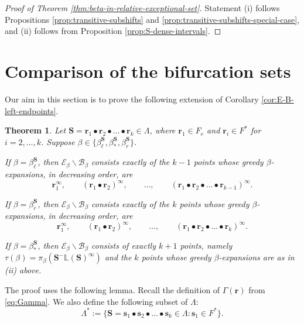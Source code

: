 \documentclass[11pt]{amsart}
\newtheorem{theorem}{Theorem}[section]
\theoremstyle{definition}
\theoremstyle{remark}
\numberwithin{equation}{section}
\renewcommand{\L}{\ensuremath{\mathbb{L}}}
\newcommand{\BB}{\mathscr{B}}
\newcommand{\EE}{\mathscr{E}}
\newcommand{\s}{ {\mathbf{s}}}
\newcommand{\cs}{ {\mathbf{S}}}
\renewcommand{\r}{ {\mathbf{r}}}
\newcommand{\Ga}{\Gamma}
\newcommand{\f}{\infty}
\newcommand{\La}{\Lambda}
\begin{document}
\begin{proof}[Proof of Theorem \ref{thm:beta-in-relative-exceptional-set}]
Statement (i) follows Propositions \ref{prop:transitive-subshifts} and \ref{prop:transitive-subshifts-special-case}, and (ii) follows from Proposition \ref{prop:S-dense-intervals}. %
\end{proof}



\section{Comparison of the bifurcation sets} \label{sec:comparison}

Our aim in this section is to prove the following extension of Corollary \ref{cor:E-B-left-endpoints}.

\begin{theorem} \label{thm:E-minus-B}
Let $\cs=\r_1\bullet \r_2\bullet\dots\bullet\r_k\in\Lambda$, where {$\r_1\in F_e$ and $\r_i\in F^*$ for $i=2,\dots,k$}. Suppose $\beta\in\{\beta_\ell^\cs,\beta_*^\cs,\beta_r^\cs\}$.
\begin{enumerate}[{\rm(i)}]
\item If $\beta=\beta_\ell^\cs$, then $\EE_\beta\backslash\BB_\beta$ consists exactly of the $k-1$ points whose greedy $\beta$-expansions, in decreasing order, are
\begin{equation} \label{eq:periodic-isolated-points}
\r_1^\f, \qquad (\r_1\bullet \r_2)^\f, \qquad \dots, \qquad (\r_1\bullet \r_2\bullet\dots\bullet \r_{k-1})^\f.
\end{equation}
\item If $\beta=\beta_r^\cs$, then $\EE_\beta\backslash\BB_\beta$ consists exactly of the $k$ points whose greedy $\beta$-expansions, in decreasing order, are
\[
\r_1^\f, \qquad (\r_1\bullet \r_2)^\f, \qquad \dots, \qquad (\r_1\bullet \r_2\bullet\dots\bullet \r_k)^\f.
\]
{
\item If $\beta=\beta_*^\cs$, then $\EE_\beta\backslash\BB_\beta$ consists of exactly $k+1$ points, namely $\tau(\beta)=\pi_\beta(\cs^-\L(\cs)^\f)$ and the $k$ points whose greedy $\beta$-expansions are as in {\rm (ii)} above.
}
\end{enumerate}
\end{theorem}

The proof uses the following lemma. Recall the definition of $\Ga(\r)$ from \eqref{eq:Gamma}. {We also define the following subset of $\La$:
\begin{equation} \label{eq:Lambda-star}
\La^*:=\{\cs=\s_1\bullet\s_2\bullet\dots\bullet \s_k\in\La: \s_1\in F^*\}.
\end{equation}
}
\end{document}
